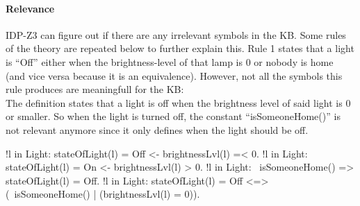\documentclass[11pt,a4paper]{report}
\begin{document}
\paragraph{Relevance}
IDP-Z3 can figure out if there are any irrelevant symbols in the KB. Some rules of the theory are repeated below to further explain this. Rule 1 states that a light is ``Off'' either when the brightness-level of that lamp is 0 or nobody is home (and vice versa because it is an equivalence). However, not all the symbols this rule produces are meaningfull for the KB:\\
The definition states that a light is off when the brightness level of said light is 0 or smaller. So when the light is turned off, the constant ``isSomeoneHome()'' is not relevant anymore since it only defines when the light should be off.

\begin{idplisting}
{
   !l in Light: stateOfLight(l) = Off <- brightnessLvl(l) =< 0.
   !l in Light: stateOfLight(l) = On <- brightnessLvl(l) > 0.
}
!l in Light: ~isSomeoneHome() => stateOfLight(l) = Off.
!l in Light: stateOfLight(l) = Off <=>
(~isSomeoneHome() | (brightnessLvl(l) = 0)).
\end{idplisting} 
\end{document}
